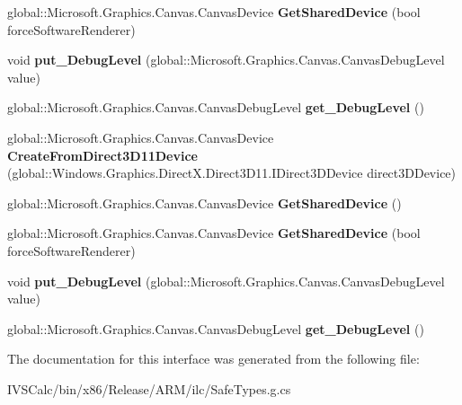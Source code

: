 \begin{DoxyCompactItemize}
global\+::\+Microsoft.\+Graphics.\+Canvas.\+Canvas\+Device {\bfseries Get\+Shared\+Device} (bool force\+Software\+Renderer)
\item 
\mbox{\label{interface_microsoft_1_1_graphics_1_1_canvas_1_1_i_canvas_device_statics_ad0fd3fa78db03abbc15b048622448383}} 
void {\bfseries put\+\_\+\+Debug\+Level} (global\+::\+Microsoft.\+Graphics.\+Canvas.\+Canvas\+Debug\+Level value)
\item 
\mbox{\label{interface_microsoft_1_1_graphics_1_1_canvas_1_1_i_canvas_device_statics_a87a1ee33571fda0a663fd8a722d12f18}} 
global\+::\+Microsoft.\+Graphics.\+Canvas.\+Canvas\+Debug\+Level {\bfseries get\+\_\+\+Debug\+Level} ()
\item 
\mbox{\label{interface_microsoft_1_1_graphics_1_1_canvas_1_1_i_canvas_device_statics_aa4908871d26502b4e2767051688362b6}} 
global\+::\+Microsoft.\+Graphics.\+Canvas.\+Canvas\+Device {\bfseries Create\+From\+Direct3\+D11\+Device} (global\+::\+Windows.\+Graphics.\+Direct\+X.\+Direct3\+D11.\+I\+Direct3\+D\+Device direct3\+D\+Device)
\item 
\mbox{\label{interface_microsoft_1_1_graphics_1_1_canvas_1_1_i_canvas_device_statics_a980677dde098e69b5c096e2e2533711e}} 
global\+::\+Microsoft.\+Graphics.\+Canvas.\+Canvas\+Device {\bfseries Get\+Shared\+Device} ()
\item 
\mbox{\label{interface_microsoft_1_1_graphics_1_1_canvas_1_1_i_canvas_device_statics_a80dff67885dd4f6bc9a02d62a3ed0e5b}} 
global\+::\+Microsoft.\+Graphics.\+Canvas.\+Canvas\+Device {\bfseries Get\+Shared\+Device} (bool force\+Software\+Renderer)
\item 
\mbox{\label{interface_microsoft_1_1_graphics_1_1_canvas_1_1_i_canvas_device_statics_ad0fd3fa78db03abbc15b048622448383}} 
void {\bfseries put\+\_\+\+Debug\+Level} (global\+::\+Microsoft.\+Graphics.\+Canvas.\+Canvas\+Debug\+Level value)
\item 
\mbox{\label{interface_microsoft_1_1_graphics_1_1_canvas_1_1_i_canvas_device_statics_a87a1ee33571fda0a663fd8a722d12f18}} 
global\+::\+Microsoft.\+Graphics.\+Canvas.\+Canvas\+Debug\+Level {\bfseries get\+\_\+\+Debug\+Level} ()
\end{DoxyCompactItemize}


The documentation for this interface was generated from the following file\+:\begin{DoxyCompactItemize}
\item 
I\+V\+S\+Calc/bin/x86/\+Release/\+A\+R\+M/ilc/Safe\+Types.\+g.\+cs\end{DoxyCompactItemize}
